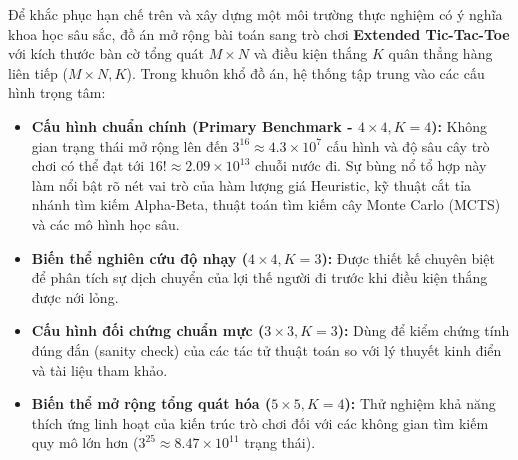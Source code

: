 \documentclass[a4paper,12pt]{report}
\begin{document}
Để khắc phục hạn chế trên và xây dựng một môi trường thực nghiệm có ý nghĩa khoa học sâu sắc, đồ án mở rộng bài toán sang trò chơi \textbf{Extended Tic-Tac-Toe} với kích thước bàn cờ tổng quát $M \times N$ và điều kiện thắng $K$ quân thẳng hàng liên tiếp ($M \times N, K$). Trong khuôn khổ đồ án, hệ thống tập trung vào các cấu hình trọng tâm:
\begin{itemize}[leftmargin=1.5cm]
    \item \textbf{Cấu hình chuẩn chính (Primary Benchmark - $4 \times 4, K=4$):} Không gian trạng thái mở rộng lên đến $3^{16} \approx 4.3 \times 10^7$ cấu hình và độ sâu cây trò chơi có thể đạt tới $16! \approx 2.09 \times 10^{13}$ chuỗi nước đi. Sự bùng nổ tổ hợp này làm nổi bật rõ nét vai trò của hàm lượng giá Heuristic, kỹ thuật cắt tỉa nhánh tìm kiếm Alpha-Beta, thuật toán tìm kiếm cây Monte Carlo (MCTS) và các mô hình học sâu.
    \item \textbf{Biến thể nghiên cứu độ nhạy ($4 \times 4, K=3$):} Được thiết kế chuyên biệt để phân tích sự dịch chuyển của lợi thế người đi trước khi điều kiện thắng được nới lỏng.
    \item \textbf{Cấu hình đối chứng chuẩn mực ($3 \times 3, K=3$):} Dùng để kiểm chứng tính đúng đắn (sanity check) của các tác tử thuật toán so với lý thuyết kinh điển và tài liệu tham khảo.
    \item \textbf{Biến thể mở rộng tổng quát hóa ($5 \times 5, K=4$):} Thử nghiệm khả năng thích ứng linh hoạt của kiến trúc trò chơi đối với các không gian tìm kiếm quy mô lớn hơn ($3^{25} \approx 8.47 \times 10^{11}$ trạng thái).
\end{itemize}
\end{document}
